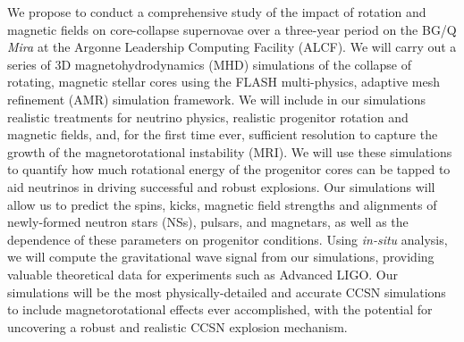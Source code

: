 \documentclass[12pt,letterpaper]{article}
\begin{document}
\begin{flushleft}
{  We propose to conduct a comprehensive study of the impact of
  rotation and magnetic fields on core-collapse supernovae over a
  three-year period on the BG/Q {\it Mira} at the Argonne Leadership
  Computing Facility (ALCF). We will carry out a series of 3D
  magnetohydrodynamics (MHD) simulations of the collapse of rotating,
  magnetic stellar cores using the FLASH multi-physics, adaptive mesh
  refinement (AMR) simulation framework.  We will include in our
  simulations realistic treatments for neutrino physics, realistic
  progenitor rotation and magnetic fields, and, for the first time
  ever, sufficient resolution to capture the growth of the
  magnetorotational instability (MRI).  We will use these simulations
  to quantify how much rotational energy of the progenitor cores can
  be tapped to aid neutrinos in driving successful and robust
  explosions.  Our simulations will allow us to predict the spins,
  kicks, magnetic field strengths and alignments of newly-formed
  neutron stars (NSs), pulsars, and magnetars, as well as the
  dependence of these parameters on progenitor conditions.  Using {\it
    in-situ} analysis, we will compute the gravitational wave signal
  from our simulations, providing valuable theoretical data for
  experiments such as Advanced LIGO.  Our simulations will be the most
  physically-detailed and accurate CCSN simulations to include
  magnetorotational effects ever accomplished, with the potential for
  uncovering a robust and realistic CCSN explosion mechanism.

}
\end{flushleft}
\end{document}
